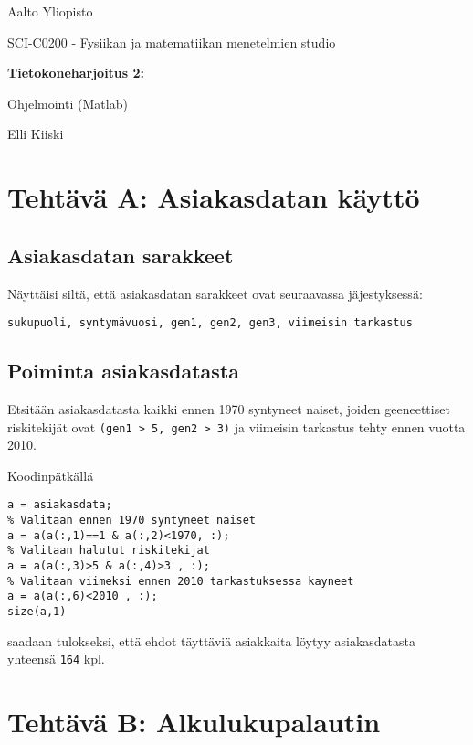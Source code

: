 \documentclass[a4paper,11pt]{article}
\begin{document}
{
\thispagestyle{empty}

{\large
Aalto Yliopisto
\par
SCI-C0200 - Fysiikan ja matematiikan menetelmien studio
}

\vspace{7cm}

{\huge \bf
Tietokoneharjoitus 2: 
\par
Ohjelmointi (Matlab)}

\vspace{2cm}

{\Large Elli Kiiski}

\clearpage

\tableofcontents

\clearpage

\section{Tehtävä A: Asiakasdatan käyttö} 		  

\subsection{Asiakasdatan sarakkeet}

Näyttäisi siltä, että asiakasdatan sarakkeet ovat seuraavassa jäjestyksessä:

\texttt{sukupuoli, syntymävuosi, gen1, gen2, gen3, viimeisin tarkastus}

\subsection{Poiminta asiakasdatasta}

Etsitään asiakasdatasta kaikki ennen 1970 syntyneet naiset, joiden geeneettiset riskitekijät ovat \texttt{(gen1 > 5, gen2 > 3)} ja viimeisin tarkastus tehty ennen vuotta 2010.

Koodinpätkällä

\begin{lstlisting}
a = asiakasdata;
% Valitaan ennen 1970 syntyneet naiset
a = a(a(:,1)==1 & a(:,2)<1970, :);
% Valitaan halutut riskitekijat
a = a(a(:,3)>5 & a(:,4)>3 , :);
% Valitaan viimeksi ennen 2010 tarkastuksessa kayneet
a = a(a(:,6)<2010 , :);
size(a,1)
\end{lstlisting}

saadaan tulokseksi, että ehdot täyttäviä asiakkaita löytyy asiakasdatasta yhteensä \texttt{164} kpl.

\section{Tehtävä B: Alkulukupalautin}

}
\end{document}
